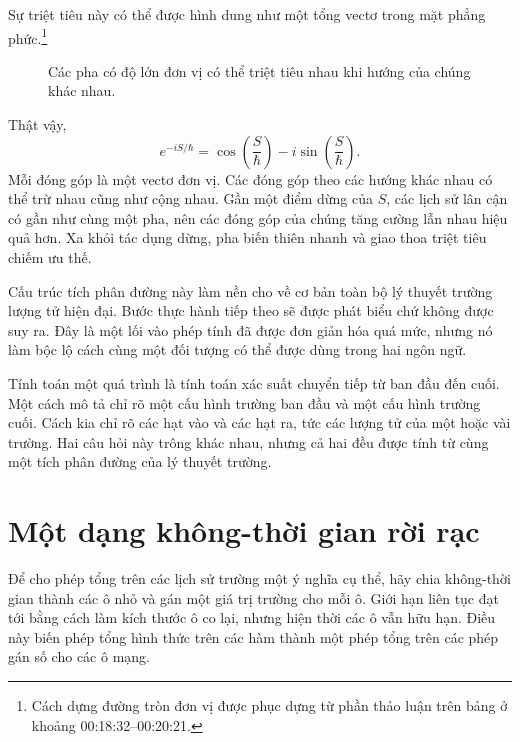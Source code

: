 Sự triệt tiêu này có thể được hình dung như một tổng vectơ trong mặt phẳng phức.\footnote{Cách dựng đường tròn đơn vị được phục dựng từ phần thảo luận trên bảng ở khoảng 00:18:32--00:20:21.}
\begin{figure}[htbp]
\centering
{}
\caption{Các pha có độ lớn đơn vị có thể triệt tiêu nhau khi hướng của chúng khác nhau.}
\end{figure}

Thật vậy,
\begin{equation}
e^{-iS/\hbar}
=
\cos\!\left(\frac{S}{\hbar}\right)
-i\sin\!\left(\frac{S}{\hbar}\right).
\end{equation}
Mỗi đóng góp là một vectơ đơn vị. Các đóng góp theo các hướng khác nhau có thể trừ nhau cũng như cộng nhau. Gần một điểm dừng của \(S\), các lịch sử lân cận có gần như cùng một pha, nên các đóng góp của chúng tăng cường lẫn nhau hiệu quả hơn. Xa khỏi tác dụng dừng, pha biến thiên nhanh và giao thoa triệt tiêu chiếm ưu thế.

Cấu trúc tích phân đường này làm nền cho về cơ bản toàn bộ lý thuyết trường lượng tử hiện đại. Bước thực hành tiếp theo sẽ được phát biểu chứ không được suy ra. Đây là một lối vào phép tính đã được đơn giản hóa quá mức, nhưng nó làm bộc lộ cách cùng một đối tượng có thể được dùng trong hai ngôn ngữ.

Tính toán một quá trình là tính toán xác suất chuyển tiếp từ ban đầu đến cuối. Một cách mô tả chỉ rõ một cấu hình trường ban đầu và một cấu hình trường cuối. Cách kia chỉ rõ các hạt vào và các hạt ra, tức các lượng tử của một hoặc vài trường. Hai câu hỏi này trông khác nhau, nhưng cả hai đều được tính từ cùng một tích phân đường của lý thuyết trường.

\section{Một dạng không-thời gian rời rạc}

Để cho phép tổng trên các lịch sử trường một ý nghĩa cụ thể, hãy chia không-thời gian thành các ô nhỏ và gán một giá trị trường cho mỗi ô. Giới hạn liên tục đạt tới bằng cách làm kích thước ô co lại, nhưng hiện thời các ô vẫn hữu hạn. Điều này biến phép tổng hình thức trên các hàm thành một phép tổng trên các phép gán số cho các ô mạng.

